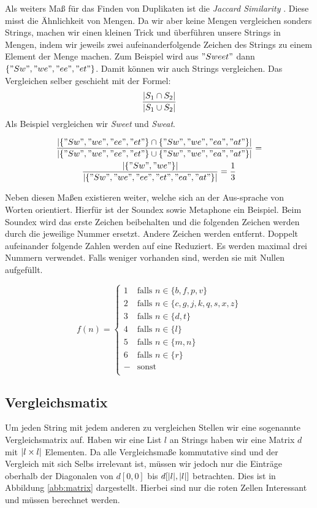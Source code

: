 \documentclass[sigconf]{acmart}
\DeclarePairedDelimiter\abs{\lvert}{\rvert}
\begin{document}
Als weiters Maß für das Finden von Duplikaten ist die
\emph{Jaccard Similarity} \cite[Vgl. 4.1.1]{theobald2008spotsigs}. Diese misst die Ähnlichkeit von Mengen.
Da wir aber keine Mengen vergleichen sonders Strings, machen wir einen
kleinen Trick und überführen unsere Strings in Mengen, indem wir
jeweils zwei aufeinanderfolgende Zeichen des Strings zu einem Element
der Menge machen. Zum Beispiel wird aus $"Sweet"$ dann
$\{"Sw", "we", "ee", "et" \}$. Damit können wir auch Strings vergleichen.
Das Vergleichen selber geschieht mit der Formel:
$$\frac{\abs{S_1 \cap S_2}}{\abs{S_1 \cup S_2}}$$
Als Beispiel vergleichen wir \emph{Sweet} und \emph{Sweat}.

\begin{gather*}
  \frac{
    \abs{\{"Sw", "we", "ee", "et" \} \cap \{"Sw", "we", "ea", "at" \}}
  }{
    \abs{\{"Sw", "we", "ee", "et" \} \cup \{"Sw", "we", "ea", "at" \}}
  }
  = \\
  \frac{
    \abs{\{"Sw", "we"\}}
  }{
    \abs{\{"Sw", "we", "ee", "et", "ea", "at" \}}
  }
  = 
  \frac{1}{3}
\end{gather*}

Neben diesen Maßen existieren weiter, welche sich an der
Aus-sprache von Worten orientiert. Hierfür ist der Soundex \cite[Vlg. S. 5]{elmagarmid1}
sowie Metaphone \cite[Vlg. S. 5]{elmagarmid1} ein Beispiel.
Beim Soundex wird das erste Zeichen beibehalten und die folgenden
Zeichen werden durch die jeweilige Nummer ersetzt. Andere Zeichen werden
entfernt. Doppelt aufeinander folgende Zahlen werden auf eine Reduziert.
Es werden maximal drei Nummern verwendet. Falls weniger vorhanden sind,
werden sie mit Nullen aufgefüllt.


\[ f(n) =
  \begin{cases}
    1      & \text{falls } n \in \{b,f,p,v\}\\
    2      & \text{falls } n \in \{c,g,j,k,q,s,x,z\}\\
    3      & \text{falls } n \in \{d,t\}\\
    4      & \text{falls } n \in \{l\}\\
    5      & \text{falls } n \in \{m,n\}\\
    6      & \text{falls } n \in \{r\}\\
    -     & \text{sonst }\\
  \end{cases}
\]




\subsection*{Vergleichsmatix}
Um jeden String mit jedem anderen zu vergleichen Stellen wir eine
sogenannte Vergleichsmatrix auf. Haben wir eine List $l$ an Strings
haben wir eine Matrix $d$ mit $\abs{l\times l}$ Elementen. Da alle
Vergleichsmaße kommutative sind und der Vergleich mit sich Selbs
irrelevant ist, müssen wir jedoch nur die Einträge oberhalb der
Diagonalen von $d[0,0]$ bis $d[\abs{l}, \abs{l}]$ betrachten.
Dies ist in Abbildung \ref{abb:matrix} dargestellt. Hierbei
sind nur die roten Zellen Interessant und müssen berechnet werden.
\end{document}
